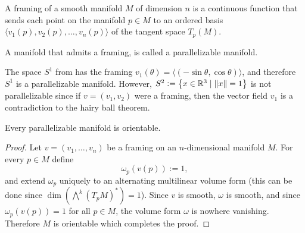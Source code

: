 \documentclass[11pt,a4paper]{article}
\begin{document}
\begin{definition}[Framing]
  \label{def:framing}
  A framing of a smooth manifold $M$ of dimension $n$ is a continuous function
  that sends each point on the manifold $p \in M$ to an ordered basis
  $\langle v_1(p),v_2(p),\dots,v_n(p) \rangle$
  of the tangent space $T_p(M)$.
\end{definition}
\begin{definition}
  A manifold that admits a framing, is called a parallelizable manifold.
\end{definition}
\begin{example}
  The space $S^1$ from 
  has the framing $v_1(\theta) = \langle (-\sin\theta,\cos\theta) \rangle$,
  and therefore $S^1$ is a parallelizable manifold.
  However, $S^2 := \left\{x \in \mathbb{R}^3 \mid \left\lVert x\right\rVert = 1\right\}$ is not parallelizable
  since if $v = (v_1,v_2)$ were a framing,
  then the vector field $v_1$ is a contradiction to the hairy ball theorem.
\end{example}

\begin{proposition}
  \label{prop:parallelizable-implies-orientable}
  Every parallelizable manifold is orientable.
\end{proposition}
\begin{proof}
  Let $v = (v_1,\dots,v_n)$ be a framing on an $n$-dimensional manifold $M$.
  For every $p \in M$ define
  \[
    \omega_p(v(p)) := 1,
  \]
  and extend $\omega_p$ uniquely to an alternating multilinear volume form
  (this can be done since $\dim(\bigwedge^{\!k}(T_p M)^*) = 1$).
  Since $v$ is smooth, $\omega$ is smooth,
  and since $\omega_p(v(p)) = 1$ for all $p \in M$,
  the volume form $\omega$ is nowhere vanishing.
  Therefore $M$ is orientable which completes the proof.
\end{proof}

\end{document}
